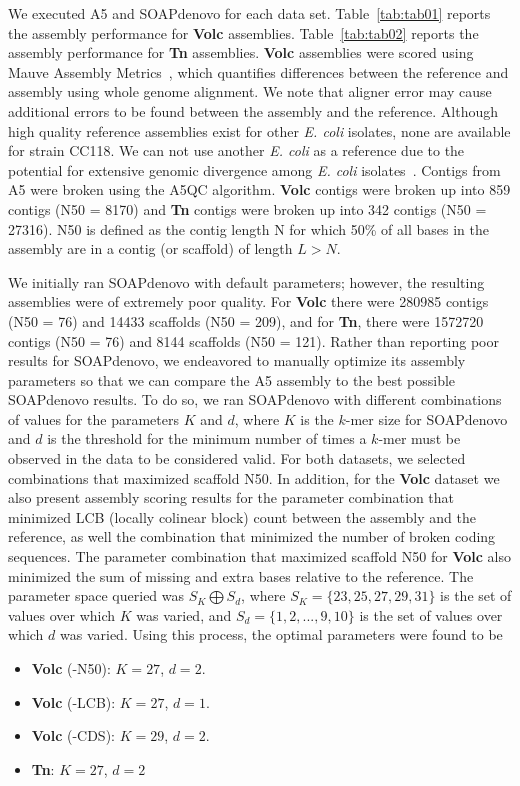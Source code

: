\documentclass[10pt]{article}
\begin{document}
We executed A5 and SOAPdenovo for each data set. Table~\ref{tab:tab01} reports the assembly performance for \textbf{Volc} assemblies.
Table~\ref{tab:tab02} reports the assembly performance for \textbf{Tn} assemblies. \textbf{Volc} assemblies were scored using Mauve Assembly 
Metrics~\cite{Darling2011}, which quantifies differences between the reference and assembly using whole genome alignment. We note that
aligner error may cause additional errors to be found between the assembly and the reference. Although high quality reference assemblies exist for other \textit{E. coli} 
isolates, none are available for strain CC118. We can not use another \textit{E. coli} as a reference due to the potential for extensive genomic divergence
among \textit{E. coli} isolates~\cite{Perna2001}. Contigs from A5 were broken using the A5QC algorithm. 
\textbf{Volc} contigs were broken up into 859 contigs (N50 = 8170) and \textbf{Tn} contigs were broken up into 342 contigs (N50 = 27316). 
N50 is defined as the contig length N for which 50\% of all bases in the assembly are in a contig (or scaffold) of length $L > N$.

We initially ran SOAPdenovo with default parameters; however, the resulting assemblies were of extremely poor quality. For \textbf{Volc} there were
280985 contigs (N50 = 76) and 14433 scaffolds (N50 = 209), and for \textbf{Tn}, there were 1572720 contigs (N50 = 76) and 8144 scaffolds (N50 = 121). 
Rather than reporting poor results for SOAPdenovo, we endeavored to manually optimize its assembly parameters so that we can compare the A5 assembly
to the best possible SOAPdenovo results. 
To do so, we ran SOAPdenovo with different combinations of values for the parameters $K$ and $d$, where $K$ is the $k$-mer size for SOAPdenovo and $d$
is the threshold for the minimum number of times a $k$-mer must be observed in the data to be considered valid.
For both datasets, we selected combinations that maximized scaffold N50. In addition, for the \textbf{Volc} dataset we also present assembly scoring
results for the parameter combination that minimized LCB (locally colinear block) count between the assembly and the reference, as well the combination that minimized the
number of broken coding sequences. The parameter combination that maximized scaffold N50 for \textbf{Volc} also minimized the sum
of missing and extra bases relative to the reference. The parameter space queried was $S_K \bigoplus S_d$,
where $S_K = \{23,25,27,29,31\}$ is the set of values over which $K$ was varied, and $S_d = \{1,2,...,9,10\}$ is the set of values over which $d$
was varied. 
Using this process, the optimal parameters were found to be
\begin{itemize}
\item \textbf{Volc} (-N50): $K = 27$, $d = 2$.
\item \textbf{Volc} (-LCB): $K = 27$, $d = 1$.
\item \textbf{Volc} (-CDS): $K = 29$, $d = 2$.
\item \textbf{Tn}: $K = 27$, $d = 2$
\end{itemize}
\end{document}
